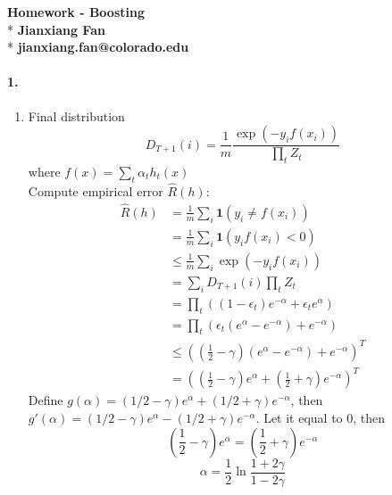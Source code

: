 \documentclass[a4paper]{article}
\begin{document}
    \begin{center}
        \Large\textbf{Homework - Boosting}\\*
        \large\textbf{Jianxiang Fan}\\*
        \large\textbf{jianxiang.fan@colorado.edu}
    \end{center}
    \paragraph{1.}
            \begin{enumerate}[{(a)}]
            \item
                Final distribution $$D_{T+1}(i) = \frac{1}{m} \frac{\exp(-y_{i}f(x_{i}))}{\prod\limits_{t}Z_{t}}$$
                where $f(x)=\sum\limits_{t}\alpha_{t} h_{t}(x)$\\                
                Compute empirical error $\hat{R}(h)$:
                \begin{equation} \label{eq1}
                    \begin{split}
                        \hat{R}(h) & = \frac{1}{m} \sum_{i} \bm{1}(y_{i} \neq f(x_{i})) \\
                                   & = \frac{1}{m} \sum_{i} \bm{1}(y_{i} f(x_{i}) < 0) \\
                                   & \leq \frac{1}{m} \sum_{i} \exp(-y_{i} f(x_{i})) \\
                                   & = \sum_{i}D_{T+1}(i) \prod_{t}Z_{t} \\
                                   & = \prod_{t} ((1-\epsilon_{t})e^{-\alpha} + \epsilon_{t}e^{\alpha}) \\
                                   & = \prod_{t} (\epsilon_{t}(e^{\alpha} - e^{-\alpha}) + e^{-\alpha}) \\
                                   & \leq ((\frac{1}{2} - \gamma)(e^{\alpha} - e^{-\alpha}) + e^{-\alpha})^{T} \\
                                   & = ((\frac{1}{2} - \gamma)e^{\alpha} + (\frac{1}{2} + \gamma)e^{-\alpha})^{T}
                    \end{split}
                \end{equation}
                Define $g(\alpha) = (1/2 - \gamma)e^{\alpha} + (1/2 + \gamma)e^{-\alpha}$, then $g'(\alpha) = (1/2 - \gamma)e^{\alpha} - (1/2 + \gamma)e^{-\alpha}$. Let it equal to 0, then
                $$(\frac{1}{2} - \gamma)e^{\alpha} = (\frac{1}{2} + \gamma)e^{-\alpha}$$
                $$\alpha = \frac{1}{2}\ln\frac{1 + 2\gamma}{1 - 2\gamma}$$

\end{enumerate}
\end{document}
